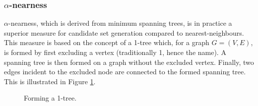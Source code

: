 \documentclass[english, 12pt, a4paper, sci, utf8, a-1b, online]{aaltothesis}
\begin{document}
\subsubsection{$\alpha$-nearness}
$\alpha$-nearness, which is derived from minimum spanning trees, is in practice a superior measure for candidate set generation compared to nearest-neighbours. This measure is based on the concept of a 1-tree \cite{HELSGAUN2000106} which, for a graph $G=(V,E)$, is formed by first excluding a vertex (traditionally 1, hence the name). A spanning tree is then formed on a graph without the excluded vertex. Finally, two edges incident to the excluded node are connected to the formed spanning tree. This is illustrated in Figure \ref{fig:1treepic}.

\begin{figure}[H]
\centering
{}
\caption{Forming a 1-tree.} \label{fig:1treepic}
\end{figure}
\end{document}
